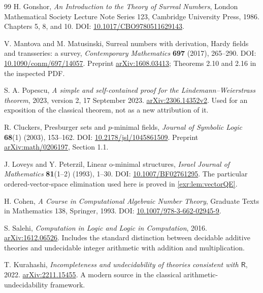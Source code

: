 \documentclass[11pt,letterpaper]{article}
\numberwithin{equation}{section}
\theoremstyle{definition}
\theoremstyle{remark}
\begin{document}
\begin{thebibliography}{99}
H. Gonshor, \emph{An Introduction to the Theory of Surreal Numbers},
London Mathematical Society Lecture Note Series 123, Cambridge University Press,
1986. Chapters 5, 8, and 10. DOI:
\href{https://doi.org/10.1017/CBO9780511629143}{10.1017/CBO9780511629143}.

V. Mantova and M. Matusinski, Surreal numbers with derivation, Hardy fields and
transseries: a survey, \emph{Contemporary Mathematics} \textbf{697} (2017),
265--290. DOI: \href{https://doi.org/10.1090/conm/697/14057}{10.1090/conm/697/14057}.
Preprint \href{https://arxiv.org/abs/1608.03413}{arXiv:1608.03413};
Theorems 2.10 and 2.16 in the inspected PDF.

S. A. Popescu, \emph{A simple and self-contained proof for the
Lindemann--Weierstrass theorem}, 2023, version 2, 17 September 2023.
\href{https://arxiv.org/abs/2306.14352v2}{arXiv:2306.14352v2}.
Used for an exposition of the classical theorem, not as a new attribution of it.

R. Cluckers, Presburger sets and $p$-minimal fields,
\emph{Journal of Symbolic Logic} \textbf{68}(1) (2003), 153--162.
DOI: \href{https://doi.org/10.2178/jsl/1045861509}{10.2178/jsl/1045861509}.
Preprint \href{https://arxiv.org/abs/math/0206197}{arXiv:math/0206197}, Section 1.1.

J. Loveys and Y. Peterzil, Linear o-minimal structures,
\emph{Israel Journal of Mathematics} \textbf{81}(1--2) (1993), 1--30.
DOI: \href{https://doi.org/10.1007/BF02761295}{10.1007/BF02761295}.
The particular ordered-vector-space elimination used here is proved in
\cref{exr:lem:vectorQE}.

H. Cohen, \emph{A Course in Computational Algebraic Number Theory},
Graduate Texts in Mathematics 138, Springer, 1993.
DOI: \href{https://doi.org/10.1007/978-3-662-02945-9}{10.1007/978-3-662-02945-9}.

S. Salehi, \emph{Computation in Logic and Logic in Computation}, 2016.
\href{https://arxiv.org/abs/1612.06526}{arXiv:1612.06526}.
Includes the standard distinction between decidable additive theories and
undecidable integer arithmetic with addition and multiplication.

T. Kurahashi, \emph{Incompleteness and undecidability of theories consistent with
$\mathsf R$}, 2022.
\href{https://arxiv.org/abs/2211.15455}{arXiv:2211.15455}.
A modern source in the classical arithmetic-undecidability framework.


\end{thebibliography}
\end{document}

